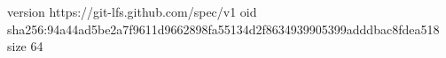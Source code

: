version https://git-lfs.github.com/spec/v1
oid sha256:94a44ad5be2a7f9611d9662898fa55134d2f8634939905399adddbac8fdea518
size 64
